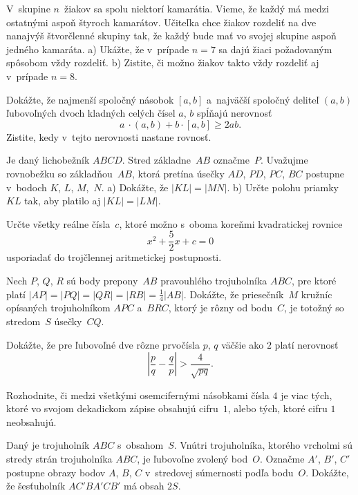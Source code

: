 {%
V~skupine $n$~žiakov sa spolu niektorí kamarátia. Vieme, že každý má medzi ostatnými %
aspoň štyroch kamarátov. Učiteľka chce žiakov rozdeliť na dve nanajvýš štvorčlenné skupiny
tak, že každý bude mať vo svojej skupine aspoň jedného kamaráta.
\ite a) Ukážte, že v~prípade $n = 7$ sa dajú žiaci požadovaným spôsobom vždy rozdeliť.
\ite b) Zistite, či možno žiakov takto vždy rozdeliť aj v~prípade $n = 8$.}

{%
Dokážte, že najmenší spoločný násobok $[a, b]$ a~najväčší spoločný deliteľ $(a, b)$ ľubovoľných
dvoch kladných celých čísel $a$, $b$ spĺňajú nerovnosť
$$
a~\cdot (a, b) + b \cdot [a, b] \ge 2ab.
$$
Zistite, kedy v~tejto nerovnosti nastane rovnosť.}

{%
Je daný lichobežník $ABCD$. Stred základne~$AB$ označme~$P$.
Uvažujme rovnobežku so základňou~$AB$, ktorá pretína úsečky $AD$, $PD$, $PC$, $BC$ postupne
v~bodoch $K$, $L$, $M$,~$N$.
\ite a) Dokážte, že $|KL| =|MN|$.
\ite b) Určte polohu priamky~$KL$ tak, aby platilo aj $|KL|=|LM|$.}

{%
Určte všetky reálne čísla~$c$, ktoré možno s~oboma koreňmi kvadratickej rovnice
$$
x^2+\frac52x+c=0
$$
usporiadať do trojčlennej aritmetickej postupnosti.}

{%
Nech $P$, $Q$, $R$ sú body prepony~$AB$ pravouhlého trojuholníka $ABC$, pre ktoré platí $|AP|=|PQ|=|QR|=|RB|=\frac14|AB|$. Dokážte, že priesečník~$M$ kružníc opísaných trojuholníkom $APC$ a~$BRC$, ktorý je rôzny od bodu~$C$, je totožný so stredom~$S$ úsečky~$CQ$.}

{%
Dokážte, že pre ľubovoľné dve rôzne prvočísla $p$, $q$ väčšie ako $2$ platí nerovnosť
$$
\left|\frac{p}{q}-\frac{q}{p}\right|>\frac{4}{\sqrt{pq}}.
$$
}

{%
Rozhodnite, či medzi všetkými osemcifernými násobkami čísla $4$ je viac tých, ktoré vo svojom dekadickom zápise obsahujú cifru~$1$, alebo tých, ktoré cifru $1$ neobsahujú.}

{%
Daný je trojuholník $ABC$ s~obsahom~$S$. Vnútri trojuholníka, ktorého vrcholmi sú stredy strán trojuholníka $ABC$,
je ľubovoľne zvolený bod~$O$. Označme $A'$, $B'$, $C'$ postupne obrazy bodov $A$, $B$, $C$ v~stredovej súmernosti podľa bodu~$O$.
Dokážte, že šesťuholník $AC'BA'CB'$ má obsah $2S$.}


